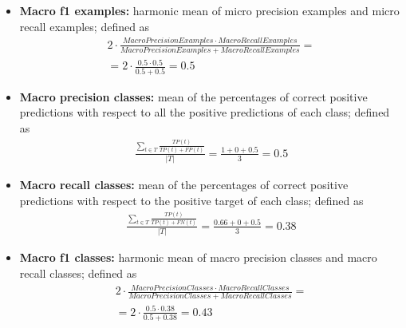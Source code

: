 \begin{itemize}
    \item \textbf{Macro f1 examples:} harmonic mean of micro precision examples and micro recall examples; defined as
    \begin{gather*}
        2 \cdot \frac{MacroPrecisionExamples \cdot MacroRecallExamples}{MacroPrecisionExamples + MacroRecallExamples} =\\
        = 2 \cdot \frac{0.5 \cdot 0.5}{0.5 + 0.5} = 0.5
    \end{gather*}
    
    \item \textbf{Macro precision classes:} mean of the percentages of correct positive predictions with respect to all the positive predictions of each class; defined as
    \begin{gather*}
        \frac{\sum_{t \in T}\frac{TP(t)}{TP(t) + FP(t)}}{|T|} =
        \frac{1 + 0 + 0.5}{3} = 0.5
    \end{gather*}
    
    \item \textbf{Macro recall classes:} mean of the percentages of correct positive predictions with respect to the positive target of each class; defined as
    \begin{gather*}
        \frac{\sum_{t \in T}\frac{TP(t)}{TP(t) + FN(t)}}{|T|} =
        \frac{0.66 + 0 + 0.5}{3} = 0.38
    \end{gather*}
    
    \item \textbf{Macro f1 classes:} harmonic mean of macro precision classes and macro recall classes; defined as
    \begin{gather*}
        2 \cdot \frac{MacroPrecisionClasses \cdot MacroRecallClasses}{MacroPrecisionClasses + MacroRecallClasses} = \\
        = 2 \cdot \frac{0.5 \cdot 0.38}{0.5 + 0.38} = 0.43
    \end{gather*}
\end{itemize}